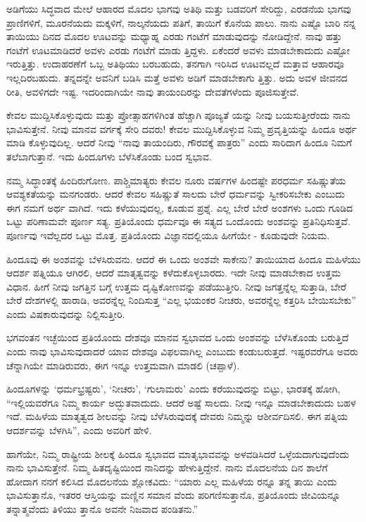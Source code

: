 ಅಡಿಗೆಯು ಸಿದ್ಧವಾದ ಮೇಲೆ ಆಹಾರದ ಮೊದಲ ಭಾಗವು ಅತಿಥಿ ಮತ್ತು ಬಡವರಿಗೆ ಸೇರಿದ್ದು, ಎರಡನೆಯ ಭಾಗವು ಪ್ರಾಣಿಗಳಿಗೆ, ಮೂರನೆಯದು ಮಕ್ಕಳಿಗೆ, ನಾಲ್ಕನೆಯದು ಪತಿಗೆ, ತಾಯಿಗೆ ಕೊನೆಯ ಪಾಲು. ನಾನು ಎಷ್ಟೊ ಬಾರಿ ನನ್ನ ತಾಯಿಯು ದಿನದ ಮೊದಲ ಊಟವನ್ನು ಮಧ್ಯಾಹ್ನ ಎರಡು ಗಂಟೆಗೆ ಮಾಡುವುದನ್ನು ನೋಡಿದ್ದೇನೆ. ನಾವು ಹತ್ತು ಗಂಟೆಗೆ ಊಟಮಾಡಿದರೆ ಅವಳು ಎರಡು ಗಂಟೆಗೆ ಮಾಡು ತ್ತಿದ್ದಳು. ಏಕೆಂದರೆ ಅವಳು ಮಾಡಬೇಕಾದುದು ಎಷ್ಟೋ ಇರುತ್ತಿತ್ತು. ಉದಾಹರಣೆಗೆ ಒಬ್ಬ ಅತಿಥಿಯು ಬರಬಹುದು, ತನಗಾಗಿ ಇರಿಸಿದ ಊಟವಲ್ಲದೆ ಮತ್ತಾವ ಆಹಾರವೂ ಇಲ್ಲದಿರಬಹುದು. ತನ್ನದನ್ನೇ ಅವನಿಗೆ ಬಡಿಸಿ ಮತ್ತೆ ಅವಳು ಅಡಿಗೆ ಮಾಡಬೇಕಾಗು ತ್ತಿತ್ತು. ಅದು ಅವಳ ಜೀವನದ ರೀತಿ, ಅವಳಿಗದೇ ಇಷ್ಟ. ಇದರಿಂದಾಗಿಯೇ ನಾವು ತಾಯಂದಿರನ್ನು ದೇವತೆಗಳೆಂದು ಪೂಜಿಸುತ್ತೇವೆ.

ಕೇವಲ ಮುದ್ದಿಸಿಕೊಳ್ಳುವುದು ಮತ್ತು ಪ್ರೋತ್ಸಾಹಗಳಿಗಿಂತ ಹೆಚ್ಚಾಗಿ ಪೂಜ್ಯತೆ ಯನ್ನು ನೀವು ಬಯಸುತ್ತೀರೆಂದು ನಾನು ಭಾವಿಸುತ್ತೇನೆ. ನೀವು ಮಾನವ ವರ್ಗಕ್ಕೆ ಸೇರಿ ದವರು! ಕೇವಲ ಮುದ್ದಿಸಿಕೊಳ್ಳುವ ನಿಮ್ಮ ಪ್ರವೃತ್ತಿಯನ್ನು ಹಿಂದೂ ಅರ್ಥ ಮಾಡಿ ಕೊಳ್ಳುವುದಿಲ್ಲ. ಆದರೆ ನೀವು “ನಾವು ತಾಯಂದಿರು, ಗೌರವಕ್ಕೆ ಪಾತ್ರರು” ಎಂದು ಸಾರಿದಾಗ ಹಿಂದೂ ನಿಮಗೆ ತಲೆಬಾಗುತ್ತಾನೆ. ಇದು ಹಿಂದೂಗಳು ಬೆಳೆಸಿಕೊಂಡು ಬಂದ ಸ್ವಭಾವ.

ನಮ್ಮ ಸಿದ್ಧಾಂತಕ್ಕೆ ಹಿಂದಿರುಗೋಣ. ಪಾಶ್ಚಿಮಾತ್ಯರು ಕೇವಲ ನೂರು ವರ್ಷಗಳ ಹಿಂದಷ್ಟೇ ಪರಧರ್ಮ ಸಹಿಷ್ಣುತೆಯ ಆವಶ್ಯಕತೆಯನ್ನು ಮನಗಂಡರು. ಆದರೆ ಕೇವಲ ಸಹಿಷ್ಣುತೆ ಸಾಲದು ಬೇರೆ ಧರ್ಮವನ್ನು ಸ್ವೀಕರಿಸಬೇಕು ಎಂಬುದು ಈಗ ನಮಗೆ ಅರ್ಥ ವಾಗಿದೆ. ಇದು ಕಳೆಯುವುದಲ್ಲ, ಕೂಡುವ ಪ್ರಶ್ನೆ. ಎಲ್ಲ ಬೇರೆ ಬೇರೆ ಅಂಶಗಳು ಒಂದು ಗೂಡಿದ ಒಟ್ಟು ಪರಿಣಾಮವೇ ಪೂರ್ಣ ಸತ್ಯ. ಪ್ರತಿಯೊಂದು ಧರ್ಮವೂ ಈ ಸತ್ಯದ ಒಂದೊಂದು ಅಂಶವನ್ನು ಪ್ರತಿನಿಧಿಸುತ್ತವೆ. ಪೂರ್ಣವು ಇವೆಲ್ಲದರ ಒಟ್ಟು ಮೊತ್ತ. ಪ್ರತಿಯೊಂದು ವಿಜ್ಞಾನದಲ್ಲಿಯೂ ಹೀಗೆಯೇ - ಕೂಡುವುದೇ ನಿಯಮ.

ಹಿಂದೂವು ಈ ಅಂಶವನ್ನು ಬೆಳಸಿರುವನು. ಆದರೆ ಈ ಒಂದು ಅಂಶವೇ ಸಾಕೇನು? ತಾಯಿಯಾದ ಹಿಂದೂ ಮಹಿಳೆಯು ಆದರ್ಶ ಪತ್ನಿಯೂ ಆಗಿರಲಿ, ಆದರೆ ಮಾತೃತ್ವವನ್ನು ಕಳೆದುಕೊಳ್ಳಬಾರದು. ಇದೇ ನೀವು ಮಾಡಬೇಕಾದ ಉತ್ತಮ ವಿಧಾನ. ಹೀಗೆ ನೀವು ಜಗತ್ತಿನ ಬಗ್ಗೆ ಉತ್ತಮ ದೃಷ್ಟಿಕೋಣವನ್ನು ಪಡೆಯುತ್ತೀರಿ. ನೀವು ಜಗತ್ತನ್ನೆಲ್ಲ ಸುತ್ತಾಡಿ, ಬೇರೆ ಬೇರೆ ದೇಶಗಳಲ್ಲಿ ಹಾರಾಡಿ, ಅವರನ್ನೆಲ್ಲ ನಿಂದಿಸುತ್ತ “ಎಲ್ಲ ಭಯಂಕರ ನೀಚರು, ಅವರನ್ನೆಲ್ಲ ಕತ್ತರಿಸಿ ಬೇಯಿಸಬೇಕು” ಎಂದು ವಿಷಕಾರುವುದನ್ನು ನಿಲ್ಲಿಸುತ್ತೀರಿ.

ಭಗವಂತನ ಇಚ್ಛೆಯಿಂದ ಪ್ರತಿಯೊಂದು ದೇಶವೂ ಮಾನವ ಸ್ವಭಾವದ ಒಂದು ಅಂಶವನ್ನು ಬೆಳೆಸಿಕೊಂಡು ಬರುತ್ತಿದೆ ಎಂದು ನಾವು ಭಾವಿಸುವುದಾದರೆ ಯಾವ ದೇಶವೂ ವಿಫಲವಾಗಿಲ್ಲ ಎಂಬುದು ಕಂಡುಬರುತ್ತದೆ. ಇಷ್ಟರವರೆಗೂ ಅವರು ಚೆನ್ನಾಗಿಯೇ ಮಾಡಿರುವರು, ಈಗ ಇನ್ನೂ ಉತ್ತಮವಾಗಿ ಮಾಡಲಿ (ಚಪ್ಪಾಳೆ).

ಹಿಂದೂಗಳನ್ನು ‘ಧರ್ಮಭ್ರಷ್ಟರು’, ‘ನೀಚರು’, ‘ಗುಲಾಮರು’ ಎಂದು ಕರೆಯುವುದನ್ನು ಬಿಟ್ಟು, ಭಾರತಕ್ಕೆ ಹೋಗಿ, “ಇಲ್ಲಿಯವರೆಗೂ ನಿಮ್ಮ ಕಾರ್ಯ ಅದ್ಭುತವಾದುದು. ಆದರೆ ಅಷ್ಟೆ ಸಾಲದು. ನೀವು ಇನ್ನೂ ಮಾಡಬೇಕಾದುದು ಬಹಳ ಇದೆ. ಮಹಿಳೆಯ ಮಾತೃತ್ವದ ಶೀಲವನ್ನು ನೀವು ಬೆಳೆಸಿರುವುದಕ್ಕೆ ದೇವರು ನಿಮ್ಮನ್ನು ಆಶೀರ್ವದಿಸಲಿ. ಈಗ ಪತ್ನಿಯ ಆದರ್ಶವನ್ನು ಬೆಳಗಿಸಿ”, ಎಂದು ಅವರಿಗೆ ಹೇಳಿ.

ಹಾಗೆಯೇ, ನಿಮ್ಮ ರಾಷ್ಟ್ರೀಯ ಶೀಲಕ್ಕೆ ಹಿಂದೂ ಸ್ವಭಾವದ ಮಾತೃಭಾವವನ್ನು ಅಳವಡಿಸಿದರೆ ಒಳ್ಳೆಯದಾಗುವುದೆಂದು ನಾನು ಭಾವಿಸುತ್ತೇನೆ. ನಿಮ್ಮ ಹಿತದೃಷ್ಟಿಯಿಂದ ನಾನಿದನ್ನು ಹೇಳುತ್ತಿದ್ದೇನೆ. ನಾನು ಮೊದಲನೆಯ ದಿನ ಶಾಲೆಗೆ ಹೋದಾಗ ನನಗೆ ಕಲಿಸಿದ ಮೊದಲನೆಯ ಶ್ಲೋಕವಿದು: “ಯಾರು ಎಲ್ಲ ಮಹಿಳೆಯ ರನ್ನೂ ತನ್ನ ತಾಯಿ ಎಂದು ಭಾವಿಸುತ್ತಾನೊ, ಇತರರ ಆಸ್ತಿಯನ್ನು ಮಣ್ಣಿನ ಸಮಾನ ವೆಂದು ಪರಿಗಣಿಸುತ್ತಾನೊ, ಪ್ರತಿಯೊಂದು ಜೀವಿಯನ್ನೂ ತನ್ನಾತ್ಮವೆಂದು ತಿಳಿಯು ತ್ತಾನೊ ಅವನೇ ನಿಜವಾದ ಪಂಡಿತನು.”

